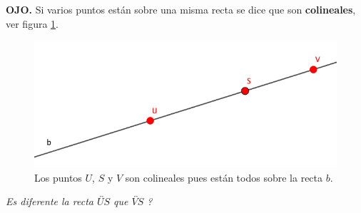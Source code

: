 \textbf{OJO.} Si varios puntos están sobre una misma recta se dice que son \textbf{colineales}, ver figura \ref{colineales}.

\begin{figure}[H]
	\centering
	\includegraphics[width=0.85\linewidth]{Geometria/imgs/colineales}
	\caption{Los puntos $U$, $S$ y $V$ son colineales pues están todos sobre la recta $b$.}
	\label{colineales}
\end{figure}

\textit{Es diferente la recta $\overleftrightarrow{US}$ que $\overleftrightarrow{VS}$ ?}\\

